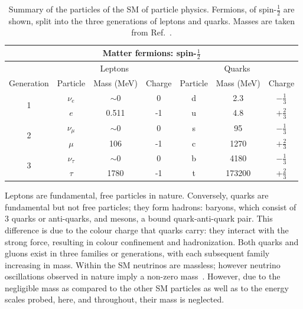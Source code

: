 \begin{table}
\begin{center}
\begin{tabular}[ht!]{c|ccc|ccc}
\hline
\multicolumn{7}{c}{Matter fermions: spin-$\frac{1}{2}$} \\ \hline
 & \multicolumn{3}{c|}{Leptons} &\multicolumn{3}{c}{Quarks} \\ 
Generation & Particle & Mass (MeV) & Charge & Particle & Mass (MeV) & Charge \\ \hline
\multirow{2}{*}{1} & $\nu_{e}$    & $\sim0$    & 0  & d & 2.3  &$-\frac{1}{3}$\\
 				   & $e$          & 0.511& -1 & u & 4.8  &$+\frac{2}{3}$\\
\multirow{2}{*}{2} & $\nu_{\mu}$  & $\sim0$    & 0  & s & 95   &$-\frac{1}{3}$\\
 				   & $\mu$        & 106  & -1 & c & 1270 &$+\frac{2}{3}$\\
\multirow{2}{*}{3} & $\nu_{\tau}$ & $\sim0$    & 0  & b & 4180 &$-\frac{1}{3}$\\
				   & $\tau$ 	  & 1780 & -1 & t & 173200 &+$\frac{2}{3}$\\ \hline
\end{tabular}
\caption{\label{tab:SMfermions}Summary of the particles of the \ac{SM} of particle physics. Fermions, of spin-$\frac{1}{2}$ are shown, split into the three generations of leptons and quarks. Masses are taken from Ref.~\cite{PDG}.}
\end{center}
\end{table}

%
Leptons are fundamental, free particles in nature. 
Conversely, quarks are fundamental but not free particles; they form hadrons: baryons, which consist of 3 quarks or anti-quarks, and mesons, a bound quark-anti-quark pair. 
This difference is due to the colour charge that quarks carry: they interact with the strong force, resulting in colour confinement and hadronization.
Both quarks and gluons exist in three families or generations, with each subsequent family increasing in mass.
Within the \ac{SM} neutrinos are massless; however neutrino oscillations observed in nature imply a non-zero mass~\cite{superK}.
However, due to the negligible mass as compared to the other \ac{SM} particles as well as to the energy scales probed, here, and throughout, their mass is neglected.

